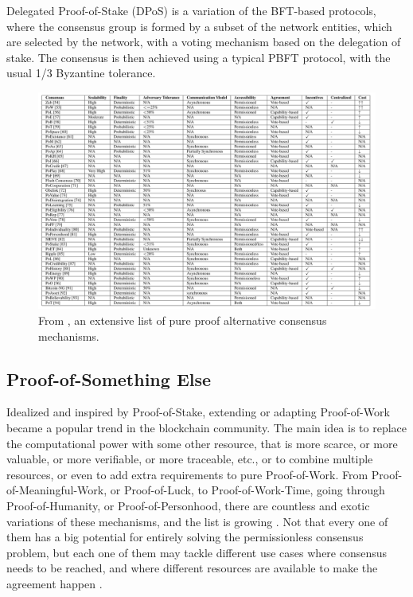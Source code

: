 \documentclass[journal]{IEEEtran}
\begin{document}
Delegated Proof-of-Stake (DPoS) is a variation of the BFT-based protocols,
where the consensus group is formed by a subset of the network entities,
which are selected by the network, with a voting mechanism based on the
delegation of stake. The consensus is then achieved using a typical 
PBFT protocol, with the usual 1/3 Byzantine tolerance.

\begin{figure}[h]
  \centering
  \captionsetup{justification=centering}
  \includegraphics[width=\textwidth]{proof-alternative-consensus}
  \caption{From \cite{9376868}, an extensive list of pure proof alternative consensus mechanisms.}
  \label{fig:proof-alternative-consensus}
\end{figure}

\subsection{Proof-of-Something Else}

Idealized and inspired by Proof-of-Stake, extending or adapting Proof-of-Work
became a popular trend in the blockchain community. The main idea is to
replace the computational power with some other resource, that is
more scarce, or more valuable, or more verifiable, or more traceable, etc.,
or to combine multiple resources, or even to add extra requirements to 
pure Proof-of-Work. From Proof-of-Meaningful-Work, or Proof-of-Luck, 
to Proof-of-Work-Time, going through Proof-of-Humanity, or Proof-of-Personhood, there
are countless and exotic variations of these mechanisms, and the list is growing \cite{token-economy-gitbook, 9376868}.
Not that every one of them has a big potential for entirely solving the permissionless consensus problem,
but each one of them may tackle different use cases where consensus needs to be reached, 
and where different resources are available to make the agreement happen \cite{BOURAGA2021114384, 9376868}.
\end{document}
